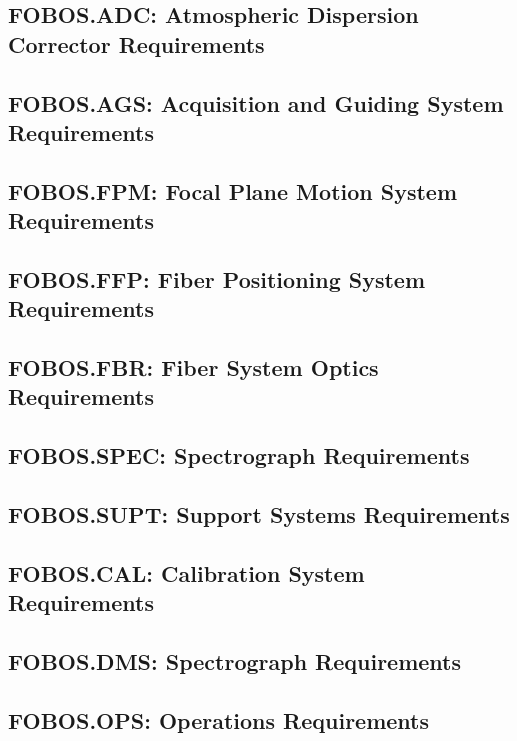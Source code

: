 \documentclass[11pt,a4paper,twoside,onecolumn,openany,final,oldfontcommands]{memoir}
\begin{document}
\subsection{FOBOS.ADC: Atmospheric Dispersion Corrector Requirements}

\subsection{FOBOS.AGS: Acquisition and Guiding System Requirements}

\subsection{FOBOS.FPM: Focal Plane Motion System Requirements}

\subsection{FOBOS.FFP: Fiber Positioning System Requirements}

\subsection{FOBOS.FBR: Fiber System Optics Requirements}

\subsection{FOBOS.SPEC: Spectrograph Requirements}
\subsection{FOBOS.SUPT: Support Systems Requirements}
\subsection{FOBOS.CAL: Calibration System Requirements}
\subsection{FOBOS.DMS: Spectrograph Requirements}
\subsection{FOBOS.OPS: Operations Requirements}

\end{document}

